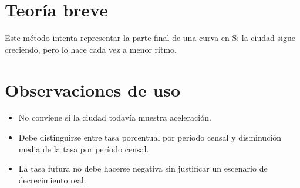 \documentclass[12pt]{article}
\begin{document}
\section{Teoría breve}
Este método intenta representar la parte final de una curva en S: la ciudad sigue creciendo, pero lo hace cada vez a menor ritmo.

\section{Observaciones de uso}
\begin{itemize}
\item No conviene si la ciudad todavía muestra aceleración.
\item Debe distinguirse entre tasa porcentual por período censal y disminución media de la tasa por período censal.
\item La tasa futura no debe hacerse negativa sin justificar un escenario de decrecimiento real.
\end{itemize}
\end{document}
